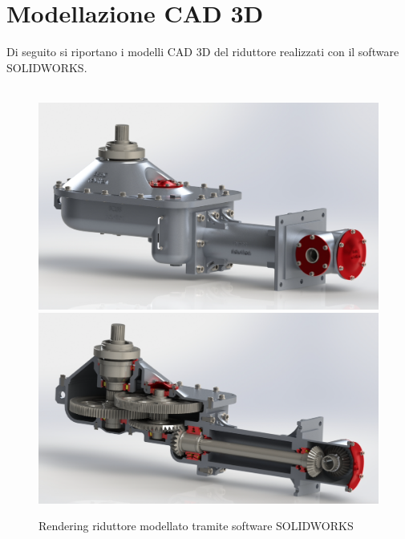 \section{Modellazione CAD 3D}
Di seguito si riportano i modelli CAD 3D del riduttore realizzati con il software SOLIDWORKS.\\
\\
\begin{figure}[h]
\centering
   {\includegraphics[scale=0.3]{Immagini/RenderingRiduttore2.png}} 
   {\includegraphics[scale=0.275]{Immagini/RenderingRiduttore1.png}} 
\caption{Rendering riduttore modellato tramite software SOLIDWORKS}
\label{fig:riduttore12}
\end{figure}
\newpage
